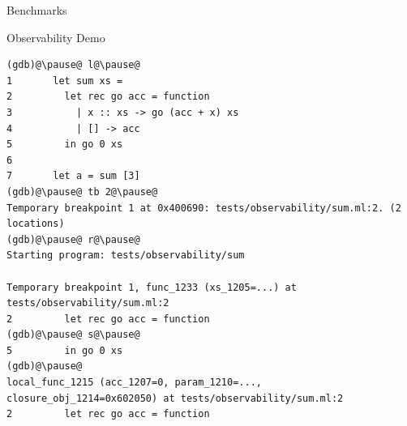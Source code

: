 \documentclass[pdf]{beamer}
\begin{document}
\begin{frame}{Benchmarks}
\begin{figure}
\end{figure}
\end{frame}

\begin{frame}[fragile]{Observability Demo}
\begin{lstlisting}[basicstyle=\ttfamily\footnotesize]
(gdb)@\pause@ l@\pause@
1       let sum xs =
2         let rec go acc = function
3           | x :: xs -> go (acc + x) xs
4           | [] -> acc
5         in go 0 xs
6
7       let a = sum [3]
(gdb)@\pause@ tb 2@\pause@
Temporary breakpoint 1 at 0x400690: tests/observability/sum.ml:2. (2 locations)
(gdb)@\pause@ r@\pause@
Starting program: tests/observability/sum 

Temporary breakpoint 1, func_1233 (xs_1205=...) at tests/observability/sum.ml:2
2         let rec go acc = function
(gdb)@\pause@ s@\pause@
5         in go 0 xs
(gdb)@\pause@
local_func_1215 (acc_1207=0, param_1210=..., closure_obj_1214=0x602050) at tests/observability/sum.ml:2
2         let rec go acc = function
\end{lstlisting}
\end{frame}
\end{document}
